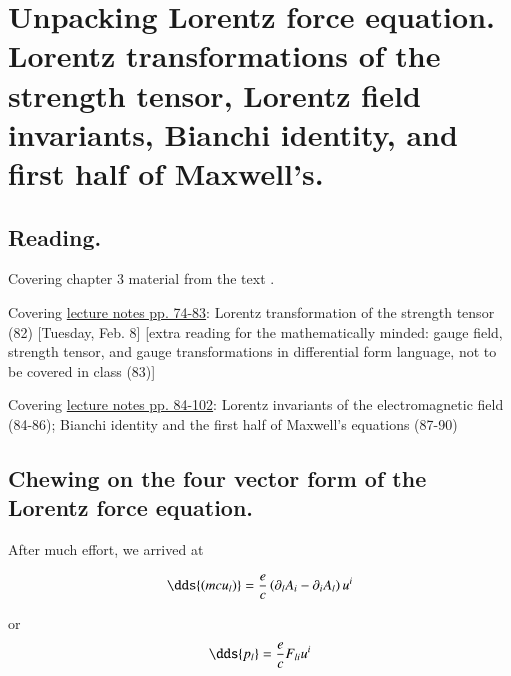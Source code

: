 %
%

\chapter{Unpacking Lorentz force equation.  Lorentz transformations of the strength tensor, Lorentz field invariants, Bianchi identity, and first half of Maxwell's.}
\label{chap:relativisticElectrodynamicsL11}
{}
\date{Feb 9, 2011}

\beginArtWithToc

\section{Reading.}

Covering chapter 3 material from the text \citep{landau1980classical}.

Covering \href{http://www.physics.utoronto.ca/~poppitz/epoppitz/PHY450_files/RelEMpp74-83.pdf}{lecture notes pp. 74-83}: Lorentz transformation of the strength tensor (82) [Tuesday, Feb. 8] [extra reading for the mathematically minded: gauge field, strength tensor, and gauge transformations in differential form language, not to be covered in class (83)] 

Covering \href{http://www.physics.utoronto.ca/~poppitz/epoppitz/PHY450_files/RelEMpp84-102.pdf}{lecture notes pp. 84-102}: Lorentz invariants of the electromagnetic field (84-86); Bianchi identity and the first half of Maxwell's equations (87-90)

\section{Chewing on the four vector form of the Lorentz force equation.}

After much effort, we arrived at 

\begin{equation}\label{eqn:relativisticElectrodynamicsL11:10}
\dds{(m c u_l) } = \frac{e}{c} \left( \partial_l A_i - \partial_i A_l \right) u^i
\end{equation}

or
\begin{equation}\label{eqn:relativisticElectrodynamicsL11:30}
\dds{ p_l } = \frac{e}{c} F_{l i} u^i
\end{equation}


